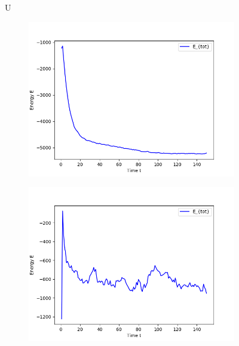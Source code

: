 \begin{figure}[ht]
\begin{subfigure}{0.3\textwidth}
\end{subfigure}

U
\hfill
\begin{subfigure}{0.3\textwidth}
\includegraphics[width=\textwidth]{../dat/Total_Energy_T0d3.png}
\end{subfigure}
\hfill
\begin{subfigure}{0.3\textwidth}
\includegraphics[width=\textwidth]{../dat/Total_Energy_T1d0.png}
\end{subfigure}
\hfill
\begin{subfigure}{0.3\textwidth}

\end{subfigure}
\end{figure}
